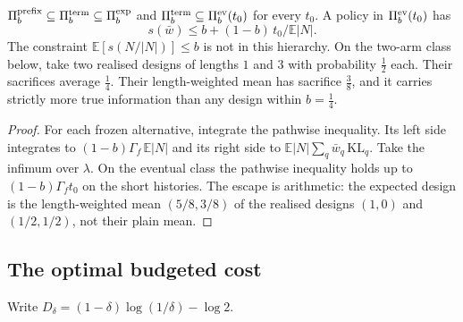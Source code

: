 \begin{proposition}
\label{prop:classes}
$\Pi_b^{\rm prefix}\subseteq\Pi_b^{\rm term}\subseteq\Pi_b^{\rm exp}$ and
$\Pi_b^{\rm term}\subseteq\Pi_b^{\rm ev}(t_0)$ for every $t_0$. A policy in
$\Pi_b^{\rm ev}(t_0)$ has
\[
s(\bar w)\le b+(1-b)\,t_0/\mathbb E|N|.
\]
The constraint $\mathbb E[s(N/|N|)]\le b$ is not in this hierarchy. On the two-arm class below,
take two realised designs of lengths $1$ and $3$ with probability $\frac12$ each. Their
sacrifices average $\frac14$. Their length-weighted mean has sacrifice $\frac38$, and it carries
strictly more true information than any design within $b=\frac14$.
\end{proposition}
\begin{proof}
For each frozen alternative, integrate the pathwise inequality. Its left side integrates to
$(1-b)\Gamma_f\,\mathbb E|N|$ and its right side to $\mathbb E|N|\sum_q\bar w_q\,\mathrm{KL}_q$.
Take the infimum over $\lambda$. On the eventual class the pathwise inequality holds up to
$(1-b)\Gamma_ft_0$ on the short histories. The escape is arithmetic: the expected design is
the length-weighted mean $(5/8,3/8)$ of the realised designs $(1,0)$ and $(1/2,1/2)$, not their
plain mean.
\end{proof}

\subsection{The optimal budgeted cost}
Write $D_\delta=(1-\delta)\log(1/\delta)-\log2$.

